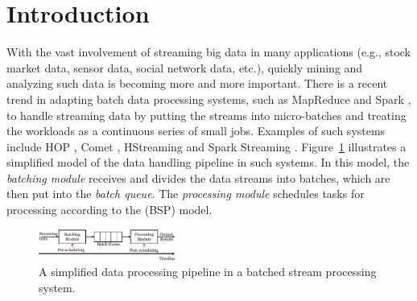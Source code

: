
\section{Introduction}

With the vast involvement of streaming big data in many applications (e.g.,
stock market data, sensor data, social network data, etc.), quickly mining and
analyzing such data is becoming more and more important. 
There is a recent trend in adapting batch data processing systems, such as
MapReduce \cite{Dean2004} and Spark \cite{Zaharia2010C}, to handle streaming
data by putting the streams into micro-batches and treating the workloads
as a continuous series of small jobs.  Examples of such systems include HOP
\cite{Condie2010}, Comet \cite{He2010}, HStreaming \cite{HStreaming} and Spark
Streaming \cite{Zaharia2013}. 
Figure~\ref{fig:simplemodel} illustrates a simplified model of the data handling
pipeline in such systems. In this model, the \emph{batching module} receives and
divides the data streams into batches, which are then put into the
\emph{batch queue}. The \emph{processing module} schedules tasks for processing
according to the (BSP) model.  \begin{figure}[htbp] \centering
  \includegraphics[width=0.40\textwidth]{FigureModel} \caption{A simplified
   data processing pipeline in a batched stream processing
system.}\label{fig:simplemodel} \end{figure}

